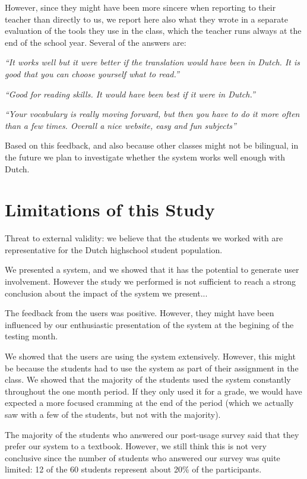 However, since they might have been more sincere when reporting to their teacher than directly to us, we report here also what they wrote in a separate evaluation of the tools they use in the class, which the teacher runs always at the end of the school year. Several of the answers are: 

\begin{description}
  \item {\em ``It works well but it were better if the translation would have been in Dutch. It is good that you can choose yourself what to read.''}
  \item {\em ``Good for reading skills. It would have been best if it were in Dutch.''}
  \item {\em ``Your vocabulary is really moving forward, but then you have to do it more often than a few times. Overall a nice website, easy and fun subjects''}
\end{description}

Based on this feedback, and also because other classes might not be bilingual, in the future we plan to investigate whether the system works well enough with Dutch.


\section{Limitations of this Study}

Threat to external validity: we believe that the students we worked with are representative for the Dutch highschool student population. 

We presented a system, and we showed that it has the potential to generate user involvement. However the study we performed is not sufficient to reach a strong conclusion about the impact of the system we present... 

The feedback from the users was positive. However, they might have been influenced by our enthusiastic presentation of the system at the begining of the testing month. 

We showed that the users are using the system extensively. However, this might be because the students had to use the system as part of their assignment in the class. We showed that the majority of the students used the system constantly throughout the one month period. If they only used it for a grade, we would have expected a more focused cramming at the end of the period (which we actually saw with a few of the students, but not with the majority). 

The majority of the students who answered our post-usage survey said that  they prefer our system to a textbook. However, we still think this is not very conclusive since the number of students who answered our survey was quite limited: 12 of the 60 students represent about 20\% of the participants. 


